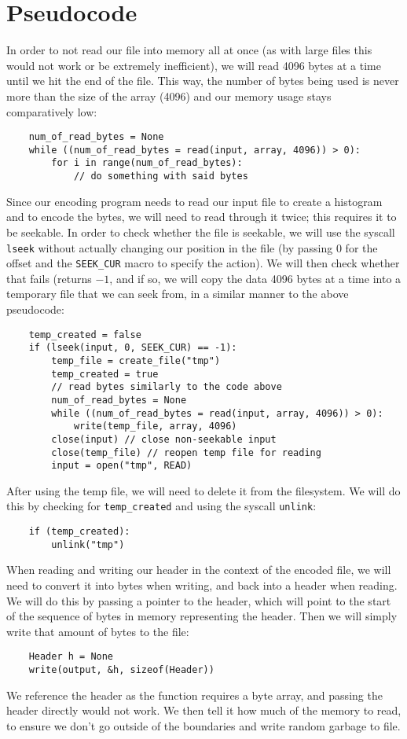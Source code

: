 \documentclass[12pt]{article}
\begin{document}
\section{Pseudocode}

In order to not read our file into memory all at once (as with large files this would not work or be extremely inefficient), we will read 4096 bytes at a time until we hit the end of the file. This way, the number of bytes being used is never more than the size of the array (4096) and our memory usage stays comparatively low: \begin{verbatim}
    num_of_read_bytes = None
    while ((num_of_read_bytes = read(input, array, 4096)) > 0):
        for i in range(num_of_read_bytes):
            // do something with said bytes
\end{verbatim}

Since our encoding program needs to read our input file to create a histogram and to encode the bytes, we will need to read through it twice; this requires it to be seekable. In order to check whether the file is seekable, we will use the syscall \verb|lseek| without actually changing our position in the file (by passing $0$ for the offset and the \verb|SEEK_CUR| macro to specify the action). We will then check whether that fails (returns $-1$, and if so, we will copy the data 4096 bytes at a time into a temporary file that we can seek from, in a similar manner to the above pseudocode:
\begin{verbatim}
    temp_created = false
    if (lseek(input, 0, SEEK_CUR) == -1):
        temp_file = create_file("tmp")
        temp_created = true
        // read bytes similarly to the code above
        num_of_read_bytes = None
        while ((num_of_read_bytes = read(input, array, 4096)) > 0):
            write(temp_file, array, 4096)
        close(input) // close non-seekable input
        close(temp_file) // reopen temp file for reading
        input = open("tmp", READ)
\end{verbatim}
After using the temp file, we will need to delete it from the filesystem. We will do this by checking for \verb|temp_created| and using the syscall \verb|unlink|:
\begin{verbatim}
    if (temp_created):
        unlink("tmp")
\end{verbatim}
When reading and writing our header in the context of the encoded file, we will need to convert it into bytes when writing, and back into a header when reading. We will do this by passing a pointer to the header, which will point to the start of the sequence of bytes in memory representing the header. Then we will simply write that amount of bytes to the file:
\begin{verbatim}
    Header h = None
    write(output, &h, sizeof(Header))
\end{verbatim}
We reference the header as the function requires a byte array, and passing the header directly would not work. We then tell it how much of the memory to read, to ensure we don't go outside of the boundaries and write random garbage to file.
\end{document}
